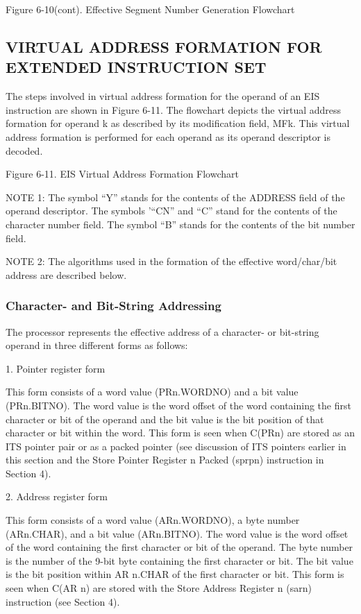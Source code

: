 Figure 6-10(cont). Effective Segment Number Generation Flowchart

\subsection{VIRTUAL ADDRESS FORMATION FOR EXTENDED INSTRUCTION SET}


The steps involved in virtual address formation for the operand of an EIS
instruction are shown in Figure 6-11. The flowchart depicts the virtual address
formation for operand k as described by its modification field, MFk. This
virtual address formation is performed for each operand as its operand
descriptor is decoded.

Figure 6-11. EIS Virtual Address Formation Flowchart


NOTE 1: The symbol {``}Y'' stands for the contents of the ADDRESS field of the
operand descriptor.  The symbols '{``}CN'' and {``}C'' stand for the contents
of the character number field. The symbol {``}B'' stands for the contents of
the bit number field.

NOTE 2: The algorithms used in the formation of the effective word/char/bit
address are described below.

\subsubsection{Character- and Bit-String Addressing}

The processor represents the effective address of a character- or bit-string
operand in three different forms as follows:

1. Pointer register form

This form consists of a word value (PRn.WORDNO) and a bit value (PRn.BITNO).
The word value is the word offset of the word containing the first character or
bit of the operand and the bit value is the bit position of that character or
bit within the word. This form is seen when C(PRn) are stored as an ITS pointer
pair or as a packed pointer (see discussion of ITS pointers earlier in this
section and the Store Pointer Register n Packed (sprpn) instruction in Section
4).

2. Address register form

This form consists of a word value (ARn.WORDNO), a byte number (ARn.CHAR), and
a bit value (ARn.BITNO). The word value is the word offset of the word
containing the first character or bit of the operand. The byte number is the
number of the 9-bit byte containing the first character or bit. The bit value
is the bit position within AR n.CHAR of the first character or bit. This form
is seen when C(AR n) are stored with the Store Address Register n (sarn)
instruction (see Section 4).


